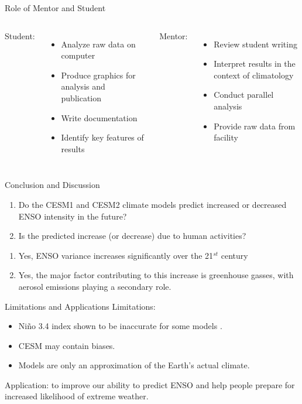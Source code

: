 \documentclass[aspectratio=1610]{beamer}
\begin{document}
\begin{frame}{Role of Mentor and Student}
  \begin{columns}[t]
    Student:
    \begin{itemize}
    \item Analyze raw data on computer
    \item Produce graphics for analysis and publication
    \item Write documentation
    \item Identify key features of results
    \end{itemize}
    Mentor:
    \begin{itemize}
    \item Review student writing
    \item Interpret results in the context of climatology
    \item Conduct parallel analysis
    \item Provide raw data from facility
    \end{itemize}
  \end{columns}
\end{frame}

\begin{frame}{Conclusion and Discussion}
  \begin{enumerate}
  \item Do the CESM1 and CESM2 climate models predict increased or decreased ENSO intensity in the future?
  \item Is the predicted increase (or decrease) due to human activities?
  \end{enumerate}
  \begin{enumerate}
  \item Yes, ENSO variance increases significantly over the 21$^{st}$ century
  \item Yes, the major factor contributing to this increase is greenhouse gasses, with aerosol emissions playing a secondary role.
  \end{enumerate}
\end{frame}

\begin{frame}{Limitations and Applications}
  Limitations:
  \begin{itemize}
  \item Niño 3.4 index shown to be inaccurate for some models \citep{cai2018increased}.
  \item CESM may contain biases.
  \item Models are only an approximation of the Earth's actual climate.
  \end{itemize}
  Application: to improve our ability to predict ENSO and help people prepare for increased likelihood of extreme weather.
\end{frame}
\end{document}
